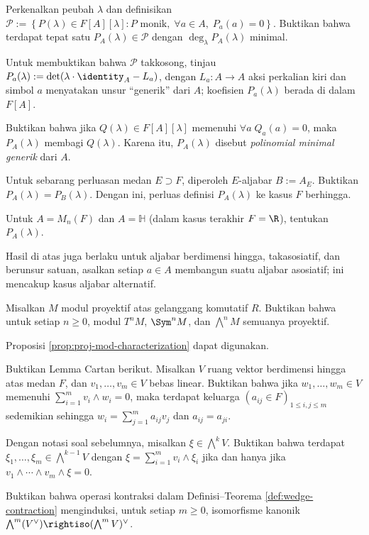 \begin{Exercises}
		\begin{compactenum}[(i)]
			\item Perkenalkan peubah $\lambda$ dan definisikan $\mathcal{P} := \left\{ P(\lambda) \in F[A][\lambda] : P \text{ monik}, \; \forall a \in A, \; P_a(a)=0 \right\}$. Buktikan bahwa terdapat tepat satu $P_A(\lambda) \in \mathcal{P}$ dengan $\deg_\lambda P_A(\lambda)$ minimal.
			\begin{hint}
				Untuk membuktikan bahwa $\mathcal{P}$ takkosong, tinjau $P_a(\lambda) := \det(\lambda \cdot \identity_A - L_a)$, dengan $L_a: A \to A$ aksi perkalian kiri dan simbol $a$ menyatakan unsur ``generik'' dari $A$; koefisien $P_a(\lambda)$ berada di dalam $F[A]$.
			\end{hint}
			\item Buktikan bahwa jika $Q(\lambda) \in F[A][\lambda]$ memenuhi $\forall a \; Q_a(a)=0$, maka $P_A(\lambda)$ membagi $Q(\lambda)$. Karena itu, $P_A(\lambda)$ disebut \emph{polinomial minimal generik} dari $A$.
			\item Untuk sebarang perluasan medan $E \supset F$, diperoleh $E$-aljabar $B := A_E$. Buktikan $P_A(\lambda) = P_B(\lambda)$. Dengan ini, perluas definisi $P_A(\lambda)$ ke kasus $F$ berhingga.
			\item Untuk $A = M_n(F)$ dan $A = \mathbb{H}$ (dalam kasus terakhir $F=\R$), tentukan $P_A(\lambda)$.
		\end{compactenum}
		Hasil di atas juga berlaku untuk aljabar berdimensi hingga, takasosiatif, dan berunsur satuan, asalkan setiap $a \in A$ membangun suatu aljabar asosiatif; ini mencakup kasus aljabar alternatif.
	\item Misalkan $M$ modul proyektif atas gelanggang komutatif $R$. Buktikan bahwa untuk setiap $n \geq 0$, modul $T^n M$, $\Sym^n M$, dan $\bigwedge^n M$ semuanya proyektif. \begin{hint}Proposisi \ref{prop:proj-mod-characterization} dapat digunakan.\end{hint}
	\item Buktikan Lemma Cartan berikut. Misalkan $V$ ruang vektor berdimensi hingga atas medan $F$, dan $v_1, \ldots, v_m \in V$ bebas linear. Buktikan bahwa jika $w_1, \ldots, w_m \in V$ memenuhi $\sum_{i=1}^m v_i \wedge w_i = 0$, maka terdapat keluarga $\left( a_{ij} \in F \right)_{1 \leq i,j \leq m}$ sedemikian sehingga $w_i = \sum_{j=1}^m a_{ij} v_j$ dan $a_{ij} = a_{ji}$.
	\item Dengan notasi soal sebelumnya, misalkan $\xi \in \bigwedge^k V$. Buktikan bahwa terdapat $\xi_1, \ldots, \xi_m \in \bigwedge^{k-1} V$ dengan $\xi = \sum_{i=1}^m v_i \wedge \xi_i$ jika dan hanya jika $v_1 \wedge \cdots \wedge v_m \wedge \xi = 0$.
	\item Buktikan bahwa operasi kontraksi dalam Definisi--Teorema \ref{def:wedge-contraction} menginduksi, untuk setiap $m \geq 0$, isomorfisme kanonik $\bigwedge^m(V^\vee) \rightiso (\bigwedge^m V)^\vee$.
\end{Exercises}
